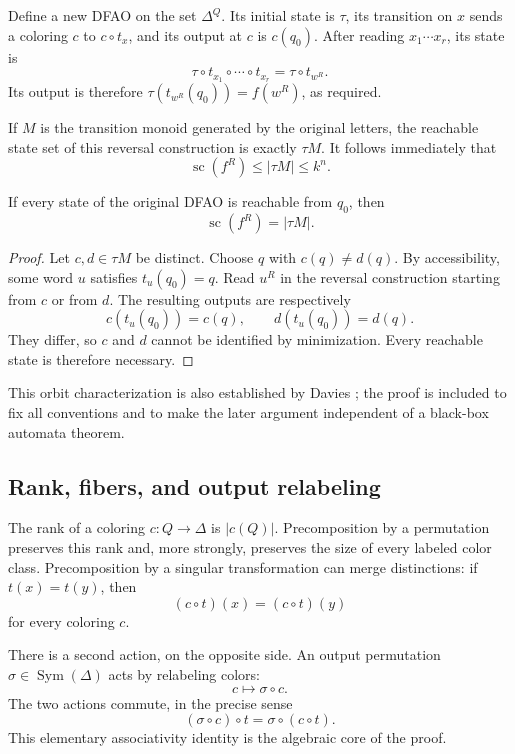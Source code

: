 \documentclass[11pt,a4paper]{article}
\numberwithin{equation}{section}
\theoremstyle{definition}
\theoremstyle{remark}
\newcommand{\D}{\Delta}
\newcommand{\Sym}{\operatorname{Sym}}
\newcommand{\statecomplex}{\operatorname{sc}}
\begin{document}
Define a new DFAO on the set $\D^Q$. Its initial state is $\tau$, its
transition on $x$ sends a coloring $c$ to $c\circ t_x$, and its output at $c$
is $c(q_0)$. After reading $x_1\cdots x_r$, its state is
\[
 \tau\circ t_{x_1}\circ\cdots\circ t_{x_r}
 =\tau\circ t_{w^R}.
\]
Its output is therefore $\tau(t_{w^R}(q_0))=f(w^R)$, as required.

If $M$ is the transition monoid generated by the original letters, the
reachable state set of this reversal construction is exactly $\tau M$.
It follows immediately that
\[
 \statecomplex(f^R)\le |\tau M|\le k^n.
\]

\begin{proposition}\label{prop:orbit}
If every state of the original DFAO is reachable from $q_0$, then
\[
 \statecomplex(f^R)=|\tau M|.
\]
\end{proposition}
\begin{proof}
Let $c,d\in\tau M$ be distinct. Choose $q$ with $c(q)\ne d(q)$. By
accessibility, some word $u$ satisfies $t_u(q_0)=q$. Read $u^R$ in the
reversal construction starting from $c$ or from $d$. The resulting outputs
are respectively
\[
 c(t_u(q_0))=c(q),\qquad d(t_u(q_0))=d(q).
\]
They differ, so $c$ and $d$ cannot be identified by minimization. Every
reachable state is therefore necessary.
\end{proof}

This orbit characterization is also established by Davies
\cite[Proposition~4]{Davies2017}; the proof is included to fix all conventions
and to make the later argument independent of a black-box automata theorem.

\subsection{Rank, fibers, and output relabeling}

The rank of a coloring $c:Q\to\D$ is $|c(Q)|$. Precomposition by a
permutation preserves this rank and, more strongly, preserves the size of
every labeled color class. Precomposition by a singular transformation can
merge distinctions: if $t(x)=t(y)$, then
\[
 (c\circ t)(x)=(c\circ t)(y)
\]
for every coloring $c$.

There is a second action, on the opposite side. An output permutation
$\sigma\in\Sym(\D)$ acts by relabeling colors:
\[
 c\longmapsto\sigma\circ c.
\]
The two actions commute, in the precise sense
\begin{equation}\label{eq:commuteactions}
 (\sigma\circ c)\circ t=\sigma\circ(c\circ t).
\end{equation}
This elementary associativity identity is the algebraic core of the proof.
\end{document}
